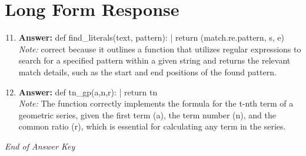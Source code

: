 \documentclass[12pt]{article}
\begin{document}
\section*{Long Form Response}
\begin{enumerate}[label=\arabic*.]
\setcounter{enumi}{10}
\item \textbf{Answer:} def find\_literals(text, pattern): | return (match.re.pattern, s, e)
\\ \textit{Note:} correct because it outlines a function that utilizes regular expressions to search for a specified pattern within a given string and returns the relevant match details, such as the start and end positions of the found pattern.
\item \textbf{Answer:} def tn\_gp(a,n,r): | return tn
\\ \textit{Note:} The function correctly implements the formula for the t-nth term of a geometric series, given the first term (a), the term number (n), and the common ratio (r), which is essential for calculating any term in the series.
\end{enumerate}

\vfill
\noindent\textit{End of Answer Key}
\end{document}
